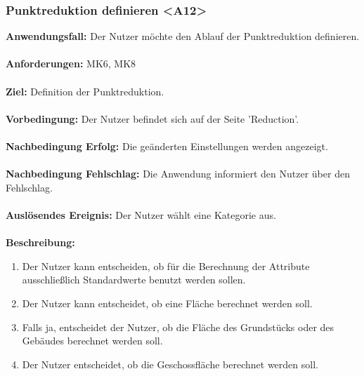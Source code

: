 \documentclass[parskip=full]{scrartcl} %
\begin{document}
\subsubsection*{Punktreduktion definieren <A12>}
\textbf{Anwendungsfall:} Der Nutzer möchte den Ablauf der Punktreduktion definieren.\\\\
\textbf{Anforderungen:} MK6, MK8\\\\
\textbf{Ziel:} Definition der Punktreduktion. \\\\
\textbf{Vorbedingung:} Der Nutzer befindet sich auf der Seite 'Reduction'.\\\\
\textbf{Nachbedingung Erfolg:} Die geänderten Einstellungen werden angezeigt. \\\\
\textbf{Nachbedingung Fehlschlag:} Die Anwendung informiert den Nutzer über den Fehlschlag. \\\\
\textbf{Auslösendes Ereignis:} Der Nutzer wählt eine Kategorie aus. \\\\
\textbf{Beschreibung:}
\begin{enumerate}
    \item Der Nutzer kann entscheiden, ob für die Berechnung der Attribute ausschließlich Standardwerte benutzt werden sollen.
    \item Der Nutzer kann entscheidet, ob eine Fläche berechnet werden soll.
    \item Falls ja, entscheidet der Nutzer, ob die Fläche des Grundstücks oder des Gebäudes berechnet werden soll.
    \item Der Nutzer entscheidet, ob die Geschossfläche berechnet werden soll.
\end{enumerate}
\newpage
\end{document}

